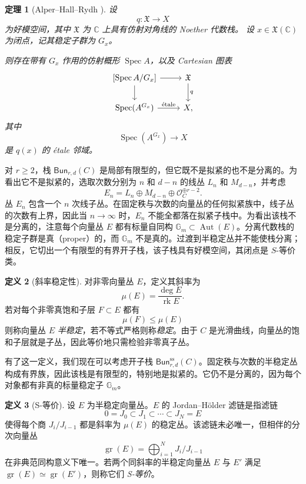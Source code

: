 \documentclass{amsart}
\newtheorem{thm}{定理}[section]
\theoremstyle{definition}
\newtheorem{defn}[thm]{定义}
\theoremstyle{remark}
\theoremstyle{plain}
\theoremstyle{definition}
\theoremstyle{remark}
\newcommand{\G}{\mathbb{G}}
\newcommand{\C}{\mathbb{C}}
\newcommand{\mc}[1]{\mathcal{#1}}
\newcommand{\mf}[1]{\mathfrak{#1}}
\newcommand{\mr}[1]{\mathrm{#1}}
\newcommand{\on}[1]{\operatorname{#1}}
\newcommand{\ms}[1]{\mathsf{#1}}
\newcommand{\1}{\mathbf{1}}
\newcommand{\2}{\mathbf{2}}
\newcommand{\3}{\mathbf{3}}
\begin{document}
\begin{thm}[Alper--Hall--Rydh {\cite{AHR2020}}]
    设
    \[
        q\colon \mf{X}\longrightarrow X
    \]
    为好模空间，其中 \(\mf{X}\) 为 \(\C\) 上具有仿射对角线的 Noether 代数栈。
    设 \(x\in\mf{X}(\C)\) 为闭点，记其稳定子群为 \(G_x\)。

    则存在带有 \(G_x\) 作用的仿射概形 \(\on{Spec}A\)，以及 Cartesian 图表
    \[
        \begin{tikzcd}
            {[\on{Spec}A/G_x]}
                \arrow[r]
                \arrow[d]
            & \mf{X}
                \arrow[d, "q"]
            \\
            \on{Spec}(A^{G_x})
                \arrow[r, "\mathrm{\acute{e}tale}"]
            & X,
        \end{tikzcd}
    \]
    其中
    \[
        \on{Spec}(A^{G_x})\longrightarrow X
    \]
    是 \(q(x)\) 的 \'etale 邻域。
\end{thm}

对 \(r\geq 2\)，栈 \(\ms{Bun}_{r,d}(C)\) 是局部有限型的，但它既不是拟紧的也不是分离的。为看出它不是拟紧的，选取次数分别为 \(n\) 和 \(d-n\) 的线丛 \(L_n\) 和 \(M_{d-n}\)，并考虑
\[
    E_n=L_n\oplus M_{d-n}\oplus\mc{O}_C^{\oplus r-2}.
\]
丛 \(E_n\) 包含一个 \(n\) 次线子丛。在固定秩与次数的向量丛的任何拟紧族中，线子丛的次数有上界，因此当 \(n\to\infty\) 时，\(E_n\) 不能全都落在拟紧子栈中。为看出该栈不是分离的，注意每个向量丛 \(E\) 都有标量自同构 \(\G_m\subset\on{Aut}(E)\)。分离代数栈的稳定子群是真（proper）的，而 \(\G_m\) 不是真的。过渡到半稳定丛并不能使栈分离；相反，它切出一个有限型的有界开子栈，该子栈具有好模空间，其闭点是 \(S\)-等价类。

\begin{defn}[斜率稳定性]
    对非零向量丛 \(E\)，定义其斜率为
    \[ \mu(E)=\frac{\deg E}{\on{rk}E}. \]
    若对每个非零真饱和子层 \(F\subset E\) 都有
    \[ \mu(F)\leq\mu(E) \]
    则称向量丛 \(E\) \textit{半稳定}，若不等式严格则称\textit{稳定}。由于 \(C\) 是光滑曲线，向量丛的饱和子层就是子丛，因此等价地只需检验非零真子丛。
\end{defn}

有了这一定义，我们现在可以考虑开子栈 \(\ms{Bun}_{r,d}^{\mr{ss}}(C)\)。固定秩与次数的半稳定丛构成有界族，因此该栈是有限型的，特别地是拟紧的。它仍不是分离的，因为每个对象都有非真的标量稳定子 \(\G_m\)。

\begin{defn}[S-等价]
    设 \(E\) 为半稳定向量丛。\(E\) 的 Jordan--H\"older 滤链是指滤链
    \[ 0=J_0\subset J_1\subset\cdots\subset J_N=E \]
    使得每个商 \(J_i/J_{i-1}\) 都是斜率为 \(\mu(E)\) 的稳定丛。该滤链未必唯一，但相伴的分次向量丛
    \[
        \on{gr}(E)=\bigoplus_{i=1}^N J_i/J_{i-1}
    \]
    在非典范同构意义下唯一。若两个同斜率的半稳定向量丛 \(E\) 与 \(E'\) 满足 \(\on{gr}(E)\simeq\on{gr}(E')\)，则称它们 \textit{S-等价}。
\end{defn}
\end{document}
